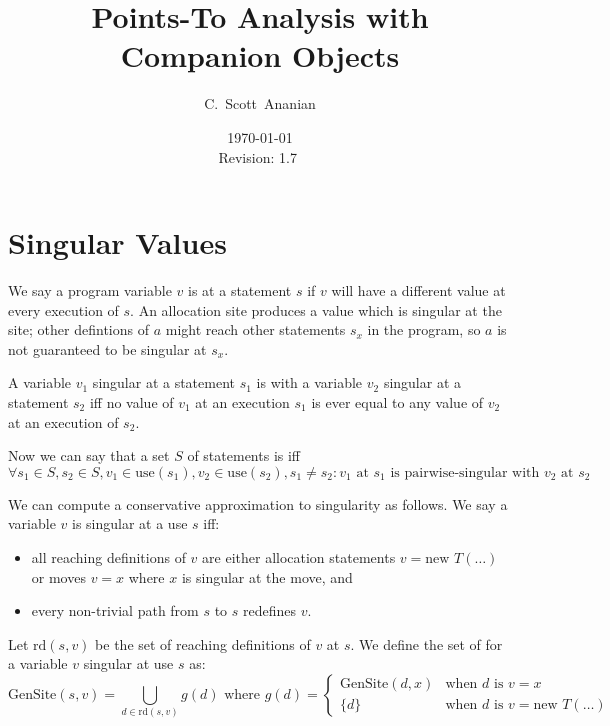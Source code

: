 \documentclass[11pt,notitlepage]{article}
\author{C.~Scott~Ananian}
\title{Points-To Analysis with Companion Objects}
\date{\today \\ $ $Revision: 1.7 $ $}
\begin{document}

\maketitle
\section{Singular Values}

We say a program variable $v$ is  at a statement $s$
if $v$ will have a different value at every execution of $s$.  An
allocation site  produces a value which is singular
at the site; other defintions of $a$ might reach other statements
$s_x$ in the program, so $a$ is not guaranteed to be singular at $s_x$.

A variable $v_1$ singular at a statement $s_1$ is
 with a variable $v_2$ singular at a statement
$s_2$ iff no value of $v_1$ at an execution $s_1$ is ever equal to any
value of $v_2$ at an execution of $s_2$.

Now we can say that a set $S$ of statements is
 iff
\begin{displaymath}
\forall s_1 \in S, s_2 \in S, v_1 \in \text{use}(s_1), v_2 \in \text{use}(s_2),
  s_1 \neq s_2 :
v_1 \text{ at } s_1 \text{ is pairwise-singular with } v_2 \text{ at } s_2
\end{displaymath}

We can compute a conservative approximation to singularity as follows.
We say a variable $v$ is singular at a use $s$ iff:
\begin{itemize}
\item all reaching definitions of $v$ are either allocation statements 
$v = \text{new }T(\ldots)$ or moves $v = x$ where $x$ is singular at
the move, and
\item every non-trivial path from $s$ to $s$ redefines $v$.
\end{itemize}

Let $\text{rd}(s,v)$ be the set of reaching definitions of $v$ at $s$.
We define the set of  for a variable $v$ singular at
use $s$ as:
\begin{displaymath}
\text{GenSite}(s,v) %
 =
\bigcup_{d \in \text{rd}(s,v)} g(d)
\text{ where }
g(d) = \left\{ \begin{array}{cl}
                \text{GenSite}(d,x) &\text{when } d \text{ is } v=x \\
		\{d\}&\text{when } d \text{ is } v=\text{new } T(\ldots)
                \end{array}\right.
\end{displaymath}
\end{document}
